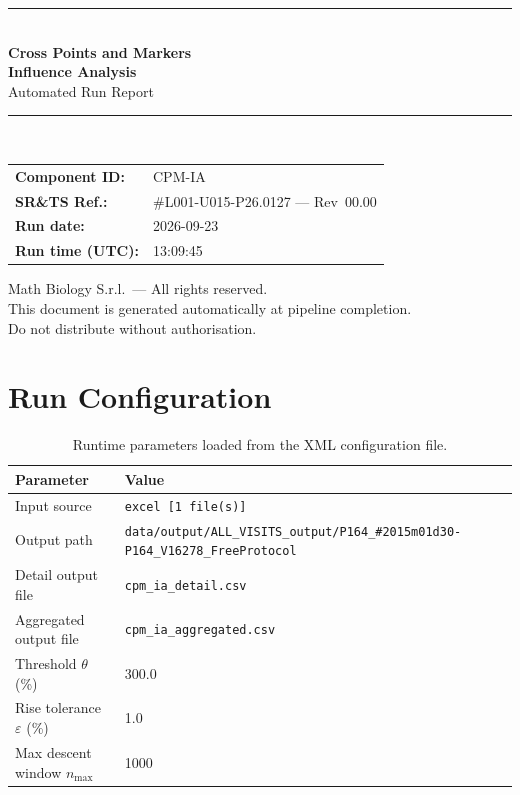 \documentclass[a4paper,11pt]{article}
\begin{document}
\begin{titlepage}
\begin{center}
  \vspace*{1.8cm}
  {\color{dmaaccent}\rule{\linewidth}{1.5pt}}\\[0.6cm]
  {\LARGE\bfseries\color{dmaaccent}
    Cross Points and Markers\\[0.25cm]
    Influence Analysis}\\[0.4cm]
  {\Large Automated Run Report}\\[0.3cm]
  {\color{dmaaccent}\rule{\linewidth}{1.5pt}}\\[2cm]

  \begin{tabular}{ll}
    \textbf{Component ID:}   & CPM-IA \\[0.3cm]
    \textbf{SR\&TS Ref.:}    & \#L001-U015-P26.0127 --- Rev~00.00 \\[0.3cm]
    \textbf{Run date:}       & 2026-09-23 \\[0.3cm]
    \textbf{Run time (UTC):} & 13:09:45 \\
  \end{tabular}

  \vfill
  {\color{dmagray}\small
    Math Biology S.r.l.\ --- All rights reserved.\\
    This document is generated automatically at pipeline completion.\\
    Do not distribute without authorisation.}
\end{center}
\end{titlepage}

\tableofcontents
\clearpage

\section{Run Configuration}

\begin{table}[h!]
\centering
\small
\caption{Runtime parameters loaded from the XML configuration file.}
\begin{tabular}{ll}
\toprule
\textbf{Parameter} & \textbf{Value} \\
\midrule
Input source                      & \texttt{excel [1 file(s)]} \\
Output path                       & \texttt{data/output/ALL\_VISITS\_output/P164\_\#2015m01d30-P164\_V16278\_FreeProtocol} \\
Detail output file                & \texttt{cpm\_ia\_detail.csv} \\
Aggregated output file            & \texttt{cpm\_ia\_aggregated.csv} \\
Threshold $\theta$ (\%)           & 300.0 \\
Rise tolerance $\varepsilon$ (\%) & 1.0 \\
Max descent window $n_{\max}$     & 1000 \\
\bottomrule
\end{tabular}
\end{table}
\end{document}
